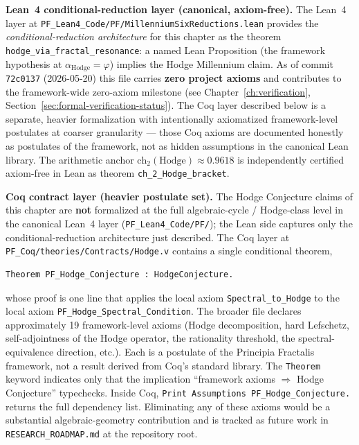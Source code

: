 \begin{remark}
\textbf{Lean~4 conditional-reduction layer (canonical, axiom-free).} The Lean~4 layer at \texttt{PF\_Lean4\_Code/PF/MillenniumSixReductions.lean} provides the \emph{conditional-reduction architecture} for this chapter as the theorem \texttt{hodge\_via\_fractal\_resonance}: a named Lean Proposition (the framework hypothesis at $\alpha_{\mathrm{Hodge}} = \varphi$) implies the Hodge Millennium claim. As of commit \texttt{72c0137} (2026-05-20) this file carries \textbf{zero project axioms} and contributes to the framework-wide zero-axiom milestone (see Chapter~\ref{ch:verification}, Section~\ref{sec:formal-verification-status}). The Coq layer described below is a separate, heavier formalization with intentionally axiomatized framework-level postulates at coarser granularity --- those Coq axioms are documented honestly as postulates of the framework, not as hidden assumptions in the canonical Lean library. The arithmetic anchor $\mathrm{ch}_2(\mathrm{Hodge}) \approx 0.9618$ is independently certified axiom-free in Lean as theorem \texttt{ch\_2\_Hodge\_bracket}.

\medskip
\textbf{Coq contract layer (heavier postulate set).}
The Hodge Conjecture claims of this chapter are \textbf{not} formalized at the full algebraic-cycle / Hodge-class level in the canonical Lean~4 layer (\texttt{PF\_Lean4\_Code/PF/}); the Lean side captures only the conditional-reduction architecture just described. The Coq layer at \texttt{PF\_Coq/theories/Contracts/Hodge.v} contains a single conditional theorem,
\begin{verbatim}
Theorem PF_Hodge_Conjecture : HodgeConjecture.
\end{verbatim}
whose proof is one line that applies the local axiom \texttt{Spectral\_to\_Hodge} to the local axiom \texttt{PF\_Hodge\_Spectral\_Condition}. The broader file declares approximately 19 framework-level axioms (Hodge decomposition, hard Lefschetz, self-adjointness of the Hodge operator, the rationality threshold, the spectral-equivalence direction, etc.). Each is a postulate of the Principia Fractalis framework, not a result derived from Coq's standard library. The \texttt{Theorem} keyword indicates only that the implication ``framework axioms $\Rightarrow$ Hodge Conjecture'' typechecks. Inside Coq, \texttt{Print Assumptions PF\_Hodge\_Conjecture.} returns the full dependency list. Eliminating any of these axioms would be a substantial algebraic-geometry contribution and is tracked as future work in \texttt{RESEARCH\_ROADMAP.md} at the repository root.
\end{remark}

